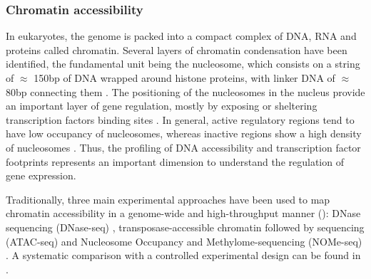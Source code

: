 \subsubsection{Chromatin accessibility} \label{section:chromatin_accessibility}
In eukaryotes, the genome is packed into a compact complex of DNA, RNA and proteins called chromatin. Several layers of chromatin condensation have been identified, the fundamental unit being the nucleosome, which consists on a string of $\approx$  150bp of DNA wrapped around histone proteins, with linker DNA of $\approx$ 80bp connecting them \cite{Klemm2019,Tsompana2014}. The positioning of the nucleosomes in the nucleus provide an important layer of gene regulation, mostly by exposing or sheltering transcription factors binding sites \cite{Jiang2009}. In general, active regulatory regions tend to have low occupancy of nucleosomes, whereas inactive regions show a high density of nucleosomes \cite{Struhl2013}. Thus, the profiling of DNA accessibility and transcription factor footprints represents an important dimension to understand the regulation of gene expression.


Traditionally, three main experimental approaches have been used to map chromatin accessibility in a genome-wide and high-throughput manner (): DNase sequencing (DNase-seq) \cite{Song2010}, transposase-accessible chromatin followed by sequencing (ATAC-seq) \cite{Buenrostro2013} and Nucleosome Occupancy and Methylome-sequencing (NOMe-seq) \cite{Kelly2012}. A systematic comparison with a controlled experimental design can be found in \cite{Nordstrom2019}.

